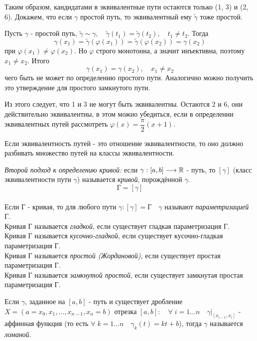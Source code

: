 \documentclass[../main.tex]{subfiles}
\begin{document}
\begin{example}
    Таким образом, кандидатами в эквивалентные пути остаются только (1, 3) и (2, 6). Докажем, что если \( \gamma \) простой путь, то эквивалентный ему \( \tilde{ \gamma }\) тоже простой. 

    Пусть \( \gamma \) - простой путь, \( \tilde{ \gamma } \sim \gamma,\quad  \tilde{ \gamma }\left( t_1\right)= \tilde{ \gamma } \left( t_2\right),\quad t_1 \neq t_2\). Тогда 
    \[ \gamma \left( x_1\right)= \tilde{ \gamma }\left( \varphi \left( x_1\right)\right)= \tilde{ \gamma }\left( \varphi \left( x_2\right)\right)= \gamma \left( x_2\right)\]
    при \( \varphi \left( x_1\right) \neq \varphi \left( x_2\right)\). Но \( \varphi \) строго монотонна, а значит инъективна, поэтому \( x_1 \neq x_2\). Итого
    \[ \gamma \left( x_1\right)= \gamma \left( x_2\right),\quad x_1 \neq x_2\]
    чего быть не может по определению простого пути. Аналогично можно получить это утверждение для простого замкнутого пути. 

    Из этого следует, что 1 и 3 не могут быть эквивалентны. Остаются 2 и 6, они действительно эквивалентны, в этом можно убедиться, если в определении эквивалентных путей рассмотреть \( \varphi\left( x\right)=\dfrac{ \pi}{ 2}\left( x+1\right) \).
\end{example}

Если эквивалентность путей - это отношение эквивалентности, то оно должно разбивать множество путей на классы эквивалентности. 

\emph{Второй подход к определению кривой:} если \( \gamma :\left[ a,b\right] \longrightarrow \mathbb{R} \) - путь, то \( \left[ \gamma \right]\) (класс эквивалентности пути \( \gamma \)) называется \emph{кривой}, порождённой \( \gamma \). 
\[ \text{Г}=\left[ \gamma \right]\]
\\
Если Г - кривая, то для любого пути \( \gamma: \left[ \gamma \right]=\text{Г}\quad  \gamma \) называют \emph{параметризацией} Г.
\\
Кривая Г называется \emph{гладкой}, если существует гладкая параметризация Г.
\\
Кривая Г называется \emph{кусочно-гладкой}, если существует кусочно-гладкая параметризация Г.
\\
Кривая Г называется \emph{простой (Жордановой)}, если существует простая параметризация Г.
\\
Кривая Г называется \emph{замкнутой простой}, если существует замкнутая простая параметризация Г.

Если \( \gamma \), заданное на \( \left[ a,b\right]\) - путь и существует дробление \( X=\left( a=x_0, x_1, \dots,x_{n-1}, x_n=b\right)\) отрезка \( \left[ a,b\right]:\quad  \forall \; i=1 \dots n\quad \gamma |_{\left[ x_{i-1 },x_i\right]}\) - аффинная функция (то есть \( \forall \; k=1 \dots n\quad \gamma _k\left( t\right)=kt+b\)), тогда \( \gamma \) называется \emph{ломаной}. 
\end{document}

